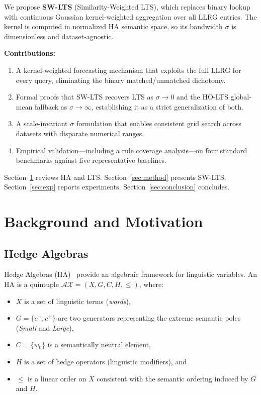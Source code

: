 \documentclass[conference]{IEEEtran}
\begin{document}
We propose \textbf{SW-LTS} (Similarity-Weighted LTS), which replaces
binary lookup with continuous Gaussian kernel-weighted aggregation
over all LLRG entries. The kernel is computed in normalized HA semantic
space, so its bandwidth $\sigma$ is dimensionless and dataset-agnostic.

\textbf{Contributions:}
\begin{enumerate}
  \item A kernel-weighted forecasting mechanism that exploits the full
        LLRG for every query, eliminating the binary matched/unmatched
        dichotomy.
  \item Formal proofs that SW-LTS recovers LTS as $\sigma \to 0$ and
        the HO-LTS global-mean fallback as $\sigma \to \infty$,
        establishing it as a strict generalization of both.
  \item A scale-invariant $\sigma$ formulation that enables consistent
        grid search across datasets with disparate numerical ranges.
  \item Empirical validation—including a rule coverage analysis—on four
        standard benchmarks against five representative baselines.
\end{enumerate}

Section~\ref{sec:background} reviews HA and LTS.
Section~\ref{sec:method} presents SW-LTS.
Section~\ref{sec:exp} reports experiments.
Section~\ref{sec:conclusion} concludes.

\section{Background and Motivation}
\label{sec:background}

\subsection{Hedge Algebras}

Hedge Algebras (HA)~\cite{catho2002ha} provide an algebraic framework
for linguistic variables. An HA is a quintuple
$\mathcal{AX} = (X, G, C, H, \leq)$, where:
\begin{itemize}
  \item $X$ is a set of linguistic terms (\emph{words}),
  \item $G = \{c^-, c^+\}$ are two generators representing the extreme
        semantic poles (\emph{Small} and \emph{Large}),
  \item $C = \{w_0\}$ is a semantically neutral element,
  \item $H$ is a set of hedge operators (linguistic modifiers), and
  \item $\leq$ is a linear order on $X$ consistent with the semantic
        ordering induced by $G$ and $H$.
\end{itemize}
\end{document}
